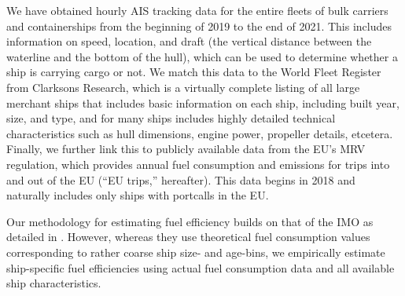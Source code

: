 \documentclass[hidelinks, 12pt,letterpaper]{article}
\begin{document}
We have obtained hourly AIS tracking data for the entire fleets of bulk carriers and containerships from the beginning of 2019 to the end of 2021. This includes information on speed, location, and draft (the vertical distance between the waterline and the bottom of the hull), which can be used to determine whether a ship is carrying cargo or not. We match this data to the World Fleet Register from Clarksons Research, which is a virtually complete listing of all large merchant ships that includes basic  information on each ship, including built year, size, and type, and for many ships includes highly detailed technical characteristics such as hull dimensions, engine power, propeller details, etcetera. Finally, we further link this to publicly available data from the EU's MRV regulation, which provides annual fuel consumption and emissions for trips into and out of the EU (``EU trips,'' hereafter). This data begins in 2018 and naturally includes only ships with portcalls in the EU.

Our methodology for estimating fuel efficiency builds on that of the IMO as detailed in \citet{faber2020fourth}.
However, whereas they use theoretical fuel consumption values corresponding to rather coarse ship size- and age-bins, we empirically estimate ship-specific fuel efficiencies using actual fuel consumption data and all available ship characteristics. 
\end{document}
